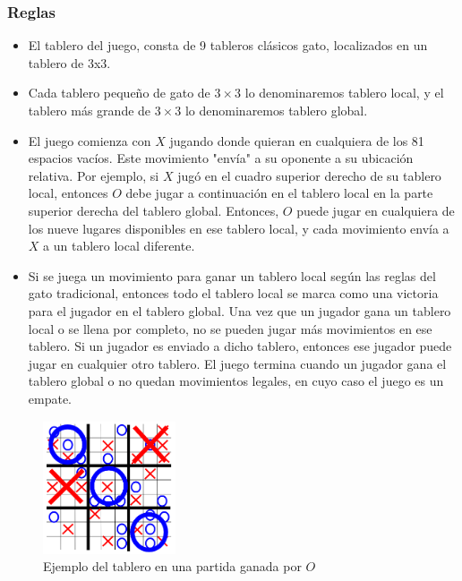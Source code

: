\documentclass[runningheads]{llncs}
\begin{document}
\subsubsection{Reglas}
\begin{itemize}
    \item El tablero del juego, consta de 9 tableros clásicos gato, localizados en un tablero de 3x3.
    \item Cada tablero pequeño de gato de $3 \times 3$ lo denominaremos tablero local, y el tablero más grande de $3 \times 3$ lo denominaremos tablero global.
    \item El juego comienza con $X$ jugando donde quieran en cualquiera de los 81 espacios vacíos. Este movimiento "envía" a su oponente a su ubicación relativa. Por ejemplo, si $X$ jugó en el cuadro superior derecho de su tablero local, entonces $O$ debe jugar a continuación en el tablero local en la parte superior derecha del tablero global. Entonces, $O$ puede jugar en cualquiera de los nueve lugares disponibles en ese tablero local, y cada movimiento envía a $X$ a un tablero local diferente.
    
    \item Si se juega un movimiento para ganar un tablero local según las reglas del gato tradicional, entonces todo el tablero local se marca como una victoria para el jugador en el tablero global. Una vez que un jugador gana un tablero local o se llena por completo, no se pueden jugar más movimientos en ese tablero. Si un jugador es enviado a dicho tablero, entonces ese jugador puede jugar en cualquier otro tablero. El juego termina cuando un jugador gana el tablero global o no quedan movimientos legales, en cuyo caso el juego es un empate.

\end{itemize}
\begin{figure}[h]
\centering
\includegraphics[width=0.35\textwidth]{images/image.png}
\caption{Ejemplo del tablero en una partida ganada por $O$}
\end{figure}
\end{document}
